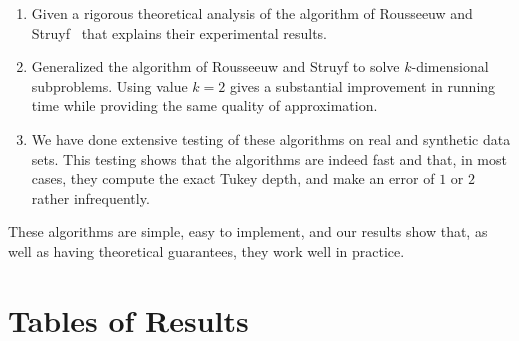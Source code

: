 \documentclass{patmorin}
\begin{document}
\begin{enumerate}
\item Given a rigorous theoretical analysis of the algorithm of Rousseeuw and Struyf~\cite{Rousseeuw98} that explains their experimental results.
\item Generalized the algorithm of Rousseeuw and Struyf to solve $k$-dimensional subproblems. Using value $k = 2$ gives a substantial improvement in running time while providing the same quality of approximation.
\item We have done extensive testing of these algorithms on real and synthetic data sets. This testing shows that the algorithms are indeed fast and that, in most cases, they compute the exact Tukey depth, and make an error of $1$ or $2$
rather infrequently.
\end{enumerate}

These algorithms are simple, easy to implement, and our results show that, as well as having theoretical guarantees, they work well in practice.




\appendix
\nolinenumbers

\section{Tables of Results} \label{app:results}

\end{document}
